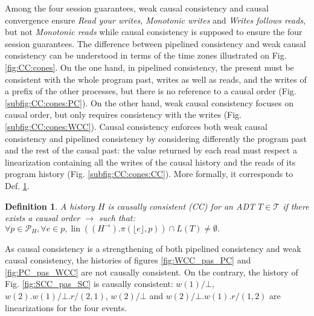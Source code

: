 \documentclass[9pt,numbers]{sigplanconf}
\newtheorem{definition}{Definition}
\DeclareMathOperator{\lin}{lin}
\begin{document}
Among the four session guarantees, weak causal consistency and causal convergence
ensure \emph{Read your writes}, \emph{Monotonic writes} and \emph{Writes follows reads}, 
but not \emph{Monotonic reads} while causal consistency is supposed to ensure the four session guarantees. 
The difference between pipelined consistency and weak causal consistency 
can be understood in terms of the time zones illustrated on 
Fig. \ref{fig:CC:cones}. On the one hand, in pipelined consistency, the present must be consistent with the 
whole program past, writes as well as reads, and the writes of a prefix of the other processes, 
but there is no reference to a causal order (Fig. \ref{subfig:CC:cones:PC}). 
On the other hand, weak causal consistency focuses on causal order, but only requires consistency with the writes (Fig. \ref{subfig:CC:cones:WCC}). 
Causal consistency enforces both weak causal consistency and pipelined consistency by considering differently the 
program past and the rest of the causal past: 
the value returned by each read must respect a linearization containing all the writes of the causal history and
the reads of its program history (Fig. \ref{subfig:CC:cones:CC}). More formally, it corresponds to Def. \ref{def:causal_consistency}.

\begin{definition}\label{def:causal_consistency} 
  A history $H$ is \emph{causally consistent} (CC) for an ADT $T\in \mathscr{T}$ if
  there exists a causal order $\rightarrow$ such that:\linebreak
  $\forall p \in \mathscr{P}_H, \forall e\in p, \lin((H^\rightarrow).\pi(\lfloor e\rfloor, p))\cap L(T) \neq \emptyset.$
\end{definition}

As causal consistency is a strengthening of both pipelined consistency and weak causal consistency, 
the histories of figures \ref{fig:WCC_pas_PC} and \ref{fig:PC_pas_WCC} are not causally consistent.
On the contrary, the history of Fig. \ref{fig:SCC_pas_SC} is causally consistent:
$w(1)/\bot$, $w(2).w(1)/\bot.r/(2,1)$, $w(2)/\bot$ and $w(2)/\bot.w(1).r/(1,2)$ are linearizations 
for the four events.
\end{document}

